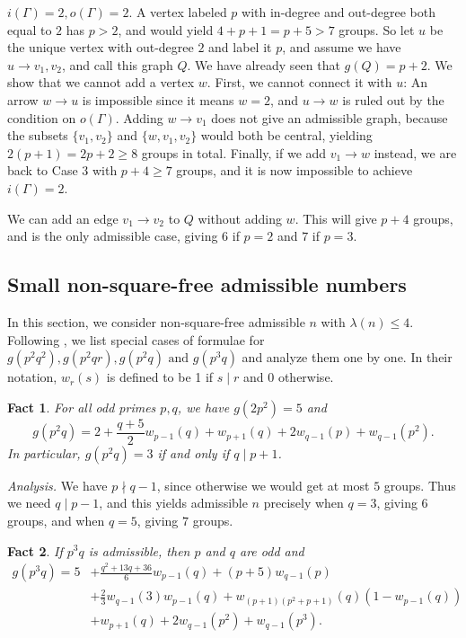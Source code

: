 \documentclass[a4paper, 12pt]{article}
\theoremstyle{plain}
\newtheorem{eufact}{Fact}[section]
\theoremstyle{definition}
\begin{document}
 $i(\Gamma) = 2, o(\Gamma) = 2$. 
A vertex labeled $p$ with in-degree and out-degree both equal to $2$ has $p > 2$, and would yield $4 + p + 1 = p + 5 > 7$ groups. So let $u$ be the unique vertex with out-degree $2$ and label it $p$, and assume we have $u \rightarrow v_1, v_2$, and call this graph $Q$. We have already seen that $g(Q) = p + 2$. We show that we cannot add a vertex $w$. First, we cannot connect it with $u$: An arrow $w \rightarrow u$ is impossible since it means $w = 2$, and $u \rightarrow w$ is ruled out by the condition on $o(\Gamma)$. Adding $w \rightarrow v_1$ does not give an admissible graph, because the subsets $\{v_1, v_2\}$ and $\{w, v_1, v_2\}$ would both be central, yielding $2(p + 1) = 2p + 2 \ge 8$ groups in total. Finally, if we add $v_1 \rightarrow w$ instead, we are back to Case $3$ with $p + 4 \ge 7$ groups, and it is now impossible to achieve $i(\Gamma) = 2$.

We can add an edge $v_1 \rightarrow v_2$ to $Q$ without adding $w$. This will give $p + 4$ groups, and is the only admissible case, giving $6$ if $p = 2$ and $7$ if $p = 3$.

\subsection{Small non-square-free admissible numbers}
In this section, we consider non-square-free admissible $n$ with $\lambda(n) \le 4$. Following {\cite{bettinafour1}}, we list special cases of formulae for $g(p^2 q^2), g(p^2 q r), g(p^2 q) \text{ and } g(p^3 q)$ and analyze them one by one. In their notation, $w_r(s)$ is defined to be 1 if $s \mid r$ and 0 otherwise. 

\begin{eufact}
	For all odd primes $p, q$, we have $g(2p^2) = 5$ and \[g(p^2 q) = 2 + \frac{q + 5}{2} w_{p - 1}(q) + w_{p + 1}(q) + 2w_{q - 1}(p) + w_{q - 1}(p^2).\] In particular, $g(p^2 q) = 3$ if and only if $q \mid p + 1$.
\end{eufact}

\textit{Analysis.} We have $p \nmid q - 1$, since otherwise we would get at most $5$ groups. Thus we need $q \mid p - 1$, and this yields admissible $n$ precisely when $q = 3$, giving $6$ groups, and when $q = 5$, giving $7$ groups.

\begin{eufact}
	If $p^3 q$ is admissible, then $p$ and $q$ are odd and
	$$\begin{aligned}
		g(p^3 q) = 5 &+ \frac{q^2 + 13q + 36}{6} w_{p - 1}(q) + (p + 5) w_{q - 1}(p) \\
		&+ \frac{2}{3} w_{q - 1}(3)w_{p - 1}(q) + w_{(p + 1)(p^2 + p + 1)}(q) (1 - w_{p - 1}(q)) \\
		&+ w_{p + 1}(q) + 2 w_{q - 1}(p^2) + w_{q - 1}(p^3).
	\end{aligned}$$
\end{eufact}
\end{document}
